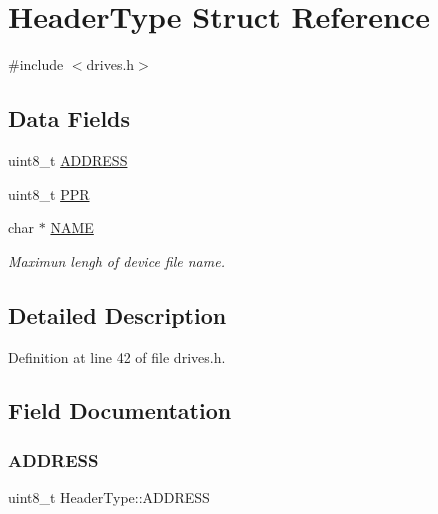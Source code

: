 \hypertarget{structHeaderType}{}\section{Header\+Type Struct Reference}
\label{structHeaderType}


{\ttfamily \#include $<$drives.\+h$>$}

\subsection*{Data Fields}
\begin{DoxyCompactItemize}
\item 
uint8\+\_\+t \hyperlink{structHeaderType_a70edfd477c537b2fa51c1aa63fcc7bee}{A\+D\+D\+R\+E\+SS}
\item 
uint8\+\_\+t \hyperlink{structHeaderType_ac642cdad0f3874495afa0ab687a56fd0}{P\+PR}
\item 
char $\ast$ \hyperlink{structHeaderType_a51c3f7025d3bc22c479e44f158471537}{N\+A\+ME}
\begin{DoxyCompactList}\small\item\em Maximun lengh of device file name. \end{DoxyCompactList}\end{DoxyCompactItemize}


\subsection{Detailed Description}


Definition at line 42 of file drives.\+h.



\subsection{Field Documentation}
\mbox{\label{structHeaderType_a70edfd477c537b2fa51c1aa63fcc7bee}} 
\subsubsection{\texorpdfstring{A\+D\+D\+R\+E\+SS}{ADDRESS}}
{\footnotesize\ttfamily uint8\+\_\+t Header\+Type\+::\+A\+D\+D\+R\+E\+SS}



